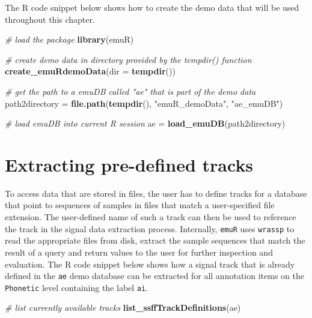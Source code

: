 \documentclass[]{book}
\newenvironment{Shaded}{\begin{snugshade}}{\end{snugshade}}
\newcommand{\CommentTok}[1]{\textcolor[rgb]{0.56,0.35,0.01}{\textit{#1}}}
\newcommand{\DataTypeTok}[1]{\textcolor[rgb]{0.13,0.29,0.53}{#1}}
\newcommand{\KeywordTok}[1]{\textcolor[rgb]{0.13,0.29,0.53}{\textbf{#1}}}
\newcommand{\NormalTok}[1]{#1}
\newcommand{\StringTok}[1]{\textcolor[rgb]{0.31,0.60,0.02}{#1}}
\begin{document}
The R code snippet below shows how to create the demo data that will be used throughout this chapter.

\begin{Shaded}
\begin{Highlighting}[]
\CommentTok{# load the package}
\KeywordTok{library}\NormalTok{(emuR)}

\CommentTok{# create demo data in directory provided by the tempdir() function}
\KeywordTok{create_emuRdemoData}\NormalTok{(}\DataTypeTok{dir =} \KeywordTok{tempdir}\NormalTok{())}

\CommentTok{# get the path to a emuDB called "ae" that is part of the demo data}
\NormalTok{path2directory =}\StringTok{ }\KeywordTok{file.path}\NormalTok{(}\KeywordTok{tempdir}\NormalTok{(), }\StringTok{"emuR_demoData"}\NormalTok{, }\StringTok{"ae_emuDB"}\NormalTok{)}

\CommentTok{# load emuDB into current R session}
\NormalTok{ae =}\StringTok{ }\KeywordTok{load_emuDB}\NormalTok{(path2directory)}
\end{Highlighting}
\end{Shaded}

\hypertarget{extracting-pre-defined-tracks}{%
\section{Extracting pre-defined tracks}\label{extracting-pre-defined-tracks}}

To access data that are stored in files, the user has to define tracks for a database that point to sequences of samples in files that match a user-specified file extension. The user-defined name of such a track can then be used to reference the track in the signal data extraction process. Internally, \texttt{emuR} uses \texttt{wrassp} to read the appropriate files from disk, extract the sample sequences that match the result of a query and return values to the user for further inspection and evaluation. The R code snippet below shows how a signal track that is already defined in the \texttt{ae} demo database can be extracted for all annotation items on the \texttt{Phonetic} level containing the label \texttt{ai}.

\begin{Shaded}
\begin{Highlighting}[]
\CommentTok{# list currently available tracks}
\KeywordTok{list_ssffTrackDefinitions}\NormalTok{(ae)}
\end{Highlighting}
\end{Shaded}
\end{document}
